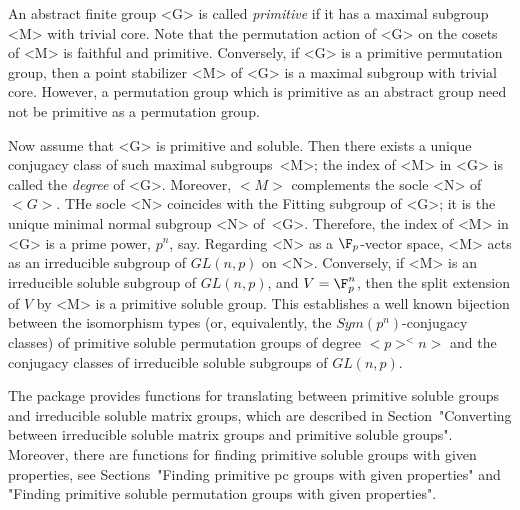 



An abstract finite group <G> is called {\it primitive} if it has a maximal 
subgroup <M> with trivial core. Note that the permutation action of <G> on the 
cosets of <M> is faithful and primitive. Conversely, if <G> is a primitive 
permutation group, then a point stabilizer <M> of <G> is a maximal
subgroup with trivial core. However, a permutation group which is primitive 
as an abstract group need not be primitive as a permutation group. 

Now assume that <G> is primitive and soluble. Then there exists a unique conjugacy class of 
such maximal subgroups~<M>; the index of <M> in <G> is called the {\it degree} of <G>.
Moreover, $<M>$ 
complements the socle <N> of $<G>$. THe socle <N> coincides with the Fitting 
subgroup of <G>; it is the unique minimal normal subgroup <N> of~<G>. Therefore, 
the index of <M> in <G> is a prime power, $p^n$, say.
Regarding <N> as a $\F_p$-vector space, <M> acts as an irreducible subgroup of $GL(n,p)$ on <N>.
Conversely, if <M> is an irreducible soluble subgroup of $GL(n,p)$, and $V = \F_p^n$, then the
split extension of $V$ by <M> is a primitive soluble group. 
This establishes a well known
bijection between the isomorphism types (or, equivalently, the 
$Sym(p^n)$-conjugacy classes) of primitive soluble permutation groups of degree
$<p>^<n>$ and the conjugacy classes of irreducible soluble subgroups of $GL(n, p)$.

The {\IRREDSOL} package provides functions for translating between primitive soluble 
groups and irreducible soluble matrix groups, which are
described in Section~"Converting between irreducible soluble matrix groups 
and primitive soluble groups". Moreover, there are functions for finding
primitive soluble groups with given properties, see Sections~"Finding primitive 
pc groups
with given properties" and "Finding primitive soluble permutation groups
with given properties".

\null

